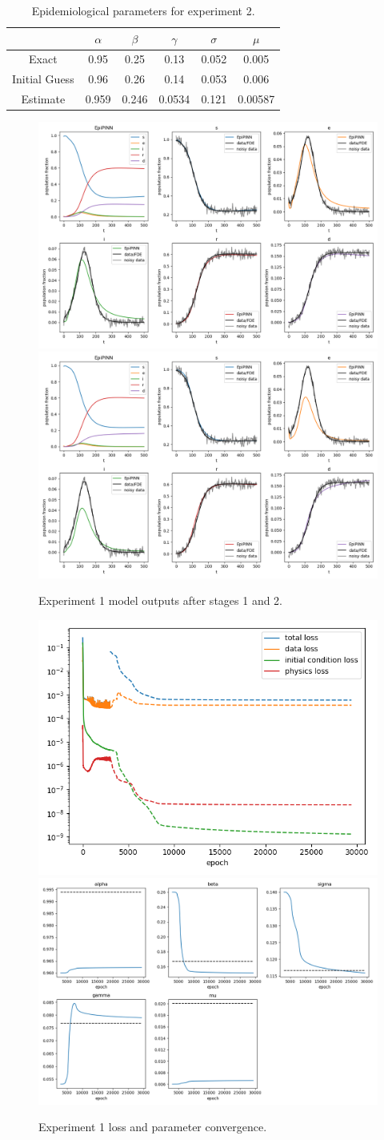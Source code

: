 \documentclass{article}
\begin{document}
	\begin{table}
		\centering
		\caption{Epidemiological parameters for experiment 2.}
		\begin{tabular}{c|ccccc}
			& $\alpha$ & $\beta$ & $\gamma$ & $\sigma$ & $\mu$ \\
			\hline
			Exact & 0.95 & 0.25 & 0.13 & 0.052 & 0.005 \\
			\hline
			Initial Guess & 0.96 & 0.26 & 0.14 & 0.053 & 0.006 \\
			Estimate & 0.959 & 0.246 & 0.0534 & 0.121 & 0.00587
		\end{tabular}
		\label{table:params2}
	\end{table}
	
	\begin{figure}
		\centering
		\includegraphics[width=0.49\linewidth]{images/experiment2_stage1.png}
		\includegraphics[width=0.49\linewidth]{images/experiment2_stage2.png}
		\caption{Experiment 1 model outputs after stages 1 and 2.}
		\label{figure:experiment2_outputs}
	\end{figure}
	
	\begin{figure}
		\centering
		\includegraphics[width=0.44\linewidth]{images/experiment2_losses.png}
		\includegraphics[width=0.49\linewidth]{images/experiment2_parameters.png}
		\caption{Experiment 1 loss and parameter convergence.}
		\label{figure:experiment2_losses}
	\end{figure}
	
\end{document}
